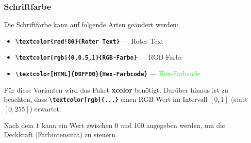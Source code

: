 \subsubsection{Schriftfarbe}
\label{sec:schriftfarbe}
Die Schriftfarbe kann auf folgende Arten geändert werden:

\begin{itemize}
    \item \textbf{\texttt{\textbackslash textcolor\{red!80\}\{Roter Text\}}}
          \hspace{2.26cm} --- \hspace{1cm} \textcolor{red!80}{Roter Text}

    \item \textbf{\texttt{\textbackslash textcolor[rgb]\{0,0.5,1\}\{RGB-Farbe\}}}
          \hspace{1.35cm} --- \hspace{1cm} \textcolor[rgb]{0,0.5,1}{RGB-Farbe}

    \item \textbf{\texttt{\textbackslash textcolor[HTML]\{00FF00\}\{Hex-Farbcode\}}}
          \hspace{0.8cm} --- \hspace{1cm} \textcolor[HTML]{00FF00}{Hex-Farbcode}
\end{itemize}

Für diese Varianten wird das Paket \textbf{xcolor} benötigt. Darüber hinaus ist zu beachten, dass \textbf{\texttt{\textbackslash textcolor[rgb]\{...\}}} einen RGB-Wert im Intervall $[0,1]$ (statt $[0,255]$) erwartet.

Nach dem \textbf{\texttt{!}} kann ein Wert zwischen 0 und 100 angegeben werden, um die Deckkraft (Farbintensität) zu steuern.


